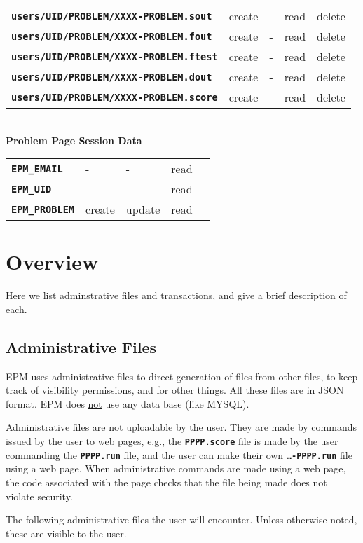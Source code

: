 \documentclass[12pt]{article}
\newcommand{\TT}[1]{{\tt \bfseries #1}}
\begin{document}
\begin{center}
\begin{tabular}{lllll}
\TT{users/UID/PROBLEM/XXXX-PROBLEM.sout}& create  & -      & read & delete \\
\TT{users/UID/PROBLEM/XXXX-PROBLEM.fout}& create  & -      & read & delete \\
\TT{users/UID/PROBLEM/XXXX-PROBLEM.ftest}& create  & -      & read & delete \\
\TT{users/UID/PROBLEM/XXXX-PROBLEM.dout}& create  & -      & read & delete \\
\TT{users/UID/PROBLEM/XXXX-PROBLEM.score}& create  & -      & read & delete \\
\end{tabular}
\\[3ex]
{\bf Problem Page Session Data}
\\[1ex]
\begin{tabular}{lllll}
\TT{EPM\_EMAIL}	& -       & -      & read \\
\TT{EPM\_UID}	& -       & -      & read \\
\TT{EPM\_PROBLEM}
		& create  & update & read \\
\end{tabular}
\end{center}

\section{Overview}

Here we list adminstrative files and transactions, and give a
brief description of each.

\subsection{Administrative Files}

EPM uses administrative files to direct generation of files from
other files, to keep track of visibility
permissions, and for other things.  All these files are in JSON
format.  EPM does \underline{not} use any data base (like MYSQL).

Administrative files are \underline{not} uploadable by the user.
They are made by commands issued by the user to web pages, e.g.,
the \TT{PPPP.score} file is made by the user commanding
the \TT{PPPP.run} file, and the user can make their own
\TT{\ldots-PPPP.run} file using a web page.  When administrative
commands are made using a web page, the code associated with the
page checks that the file being made does not violate security.

The following administrative files the user will encounter.
Unless otherwise noted, these are visible to the user.
\end{document}
